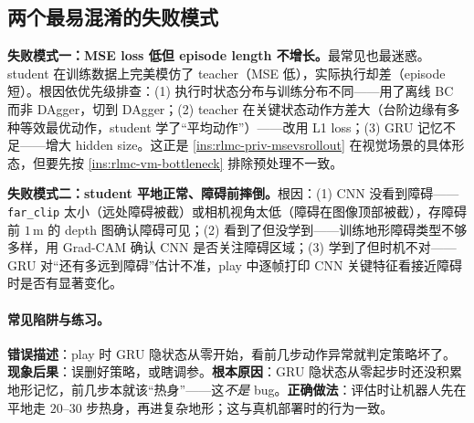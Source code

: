 \subsection{两个最易混淆的失败模式}
\label{sec:rlmc-vm-failmodes}

\textbf{失败模式一：MSE loss 低但 episode length 不增长。}最常见也最迷惑。student 在训练数据上完美模仿了 teacher（MSE 低），实际执行却差（episode 短）。根因依优先级排查：(1) 执行时状态分布与训练分布不同——用了离线 BC 而非 DAgger，切到 DAgger；(2) teacher 在关键状态动作方差大（台阶边缘有多种等效最优动作，student 学了“平均动作”）——改用 L1 loss；(3) GRU 记忆不足——增大 hidden size。这正是 \cref{ins:rlmc-priv-msevsrollout} 在视觉场景的具体形态，但要先按 \cref{ins:rlmc-vm-bottleneck} 排除预处理不一致。

\textbf{失败模式二：student 平地正常、障碍前摔倒。}根因：(1) CNN 没看到障碍——\verb|far_clip| 太小（远处障碍被截）或相机视角太低（障碍在图像顶部被截），存障碍前 $1$\,m 的 depth 图确认障碍可见；(2) 看到了但没学到——训练地形障碍类型不够多样，用 Grad-CAM 确认 CNN 是否关注障碍区域；(3) 学到了但时机不对——GRU 对“还有多远到障碍”估计不准，play 中逐帧打印 CNN 关键特征看接近障碍时是否有显著变化。

\paragraph{常见陷阱与练习。}

\begin{pitfall}
\textbf{错误描述}：play 时 GRU 隐状态从零开始，看前几步动作异常就判定策略坏了。\textbf{现象后果}：误删好策略，或瞎调参。\textbf{根本原因}：GRU 隐状态从零起步时还没积累地形记忆，前几步本就该“热身”——这\emph{不是} bug。\textbf{正确做法}：评估时让机器人先在平地走 $20$--$30$ 步热身，再进复杂地形；这与真机部署时的行为一致。
\end{pitfall}

\begin{practice}[把诊断跑成一条曲线]
\end{practice}

